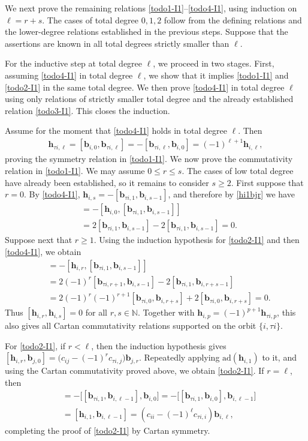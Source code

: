 \documentclass[11pt,reqno]{amsart}
\numberwithin{equation}{section}
\theoremstyle{definition}
\theoremstyle{remark}
\newcommand{\bN}{\mathbb{N}}
\newcommand{\bb}{\mathbf{b}}
\newcommand{\bh}{\mathbf{h}}
\newcommand{\gge}{\geqslant}
\newcommand{\lle}{\leqslant}
\begin{document}
We next prove the remaining relations \eqref{todo1-I1}--\eqref{todo4-I1}, using induction on $\ell=r+s$.  The cases of total
degree $0,1,2$ follow from the defining relations and the lower-degree
relations established in the previous steps. Suppose that the assertions are known in all
total degrees strictly smaller than $\ell$.

For the inductive step at total degree $\ell$, we proceed in two
stages. First, assuming \eqref{todo4-I1} in total degree $\ell$,
we show that it implies \eqref{todo1-I1} and \eqref{todo2-I1}
in the same total degree. We then prove \eqref{todo4-I1} in total
degree $\ell$ using only relations of strictly smaller total degree
and the already established relation \eqref{todo3-I1}. This closes
the induction.

Assume for the moment that \eqref{todo4-I1} holds in total degree
$\ell$. Then
\begin{align*}
\bh_{\tau i,\ell}
=[\bb_{i,0},\bb_{\tau i,\ell}]
=-[\bb_{\tau i,\ell},\bb_{i,0}]
=(-1)^{\ell+1}\bh_{i,\ell},
\end{align*}
proving the symmetry relation in
\eqref{todo1-I1}. We now prove the commutativity relation in \eqref{todo1-I1}. We may
assume $0\lle r\lle s$. The cases of low total degree have already been
established, so it remains to consider $s\gge 2$. First suppose that
$r=0$. By \eqref{todo4-I1},
$\bh_{i,s}=-[\bb_{\tau i,1},\bb_{i,s-1}]$, and therefore by \eqref{hi1bjr} we have
\begin{align*}
[\bh_{i,0},\bh_{i,s}]
&=-[\bh_{i,0},[\bb_{\tau i,1},\bb_{i,s-1}]]
\\
&=2[\bb_{\tau i,1},\bb_{i,s-1}]
  -2[\bb_{\tau i,1},\bb_{i,s-1}]
=0.
\end{align*}
Suppose next that $r\gge 1$. Using the induction hypothesis for
\eqref{todo2-I1} and then \eqref{todo4-I1}, we obtain
\begin{align*}
[\bh_{i,r},\bh_{i,s}]
&=-[\bh_{i,r},[\bb_{\tau i,1},\bb_{i,s-1}]]
\\
&=2(-1)^r[\bb_{\tau i,r+1},\bb_{i,s-1}]
  -2[\bb_{\tau i,1},\bb_{i,r+s-1}]
\\
&=2(-1)^r(-1)^{r+1}
  [\bb_{\tau i,0},\bb_{i,r+s}]
  +2[\bb_{\tau i,0},\bb_{i,r+s}]
=0.
\end{align*}
Thus $[\bh_{i,r},\bh_{i,s}]=0$ for all $r,s\in\bN$.
Together with $\bh_{i,p}=(-1)^{p+1}\bh_{\tau i,p}$, this also gives all Cartan
commutativity relations supported on the orbit $\{i,\tau i\}$.

For \eqref{todo2-I1}, if $r<\ell$, then the induction hypothesis gives $[\bh_{i,r},\bb_{j,0}]
=\big(c_{ij}-(-1)^r c_{\tau i,j}\big)\bb_{j,r}.$
Repeatedly applying $\mathrm{ad}(\bh_{i,1})$ to
it, and using the Cartan commutativity proved above, we
obtain \eqref{todo2-I1}. If $r=\ell$, then
\begin{align*}
[\bh_{i,\ell},\bb_{i,0}]&=-\big[[\bb_{\tau i,1},\bb_{i,\ell-1}],\bb_{i,0}\big]=-\big[[\bb_{\tau i,1},\bb_{i,0}],\bb_{i,\ell-1}\big]\\&=[\bh_{i,1},\bb_{i,\ell-1}]=(c_{ii}-(-1)^\ell c_{\tau i,i})\bb_{i,\ell},
\end{align*}
completing the proof of 
\eqref{todo2-I1} by Cartan symmetry.
\end{document}
